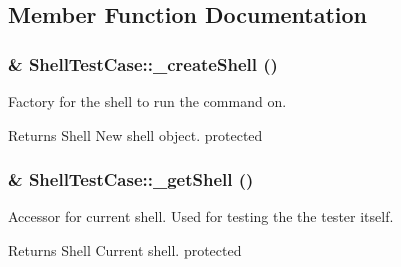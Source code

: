 \subsection{Member Function Documentation}
\hypertarget{class_shell_test_case_a0f75705b8a86cd6dfbe7d38a040e53e4}{
\subsubsection[{\_\-createShell}]{\setlength{\rightskip}{0pt plus 5cm}\& ShellTestCase::\_\-createShell ()}}
\label{class_shell_test_case_a0f75705b8a86cd6dfbe7d38a040e53e4}
Factory for the shell to run the command on. \begin{DoxyReturn}{Returns}
Shell New shell object.  protected 
\end{DoxyReturn}
\hypertarget{class_shell_test_case_a51aeeea213f51d1f4b17173fd507d782}{
\subsubsection[{\_\-getShell}]{\setlength{\rightskip}{0pt plus 5cm}\& ShellTestCase::\_\-getShell ()}}
\label{class_shell_test_case_a51aeeea213f51d1f4b17173fd507d782}
Accessor for current shell. Used for testing the the tester itself. \begin{DoxyReturn}{Returns}
Shell Current shell.  protected 
\end{DoxyReturn}


